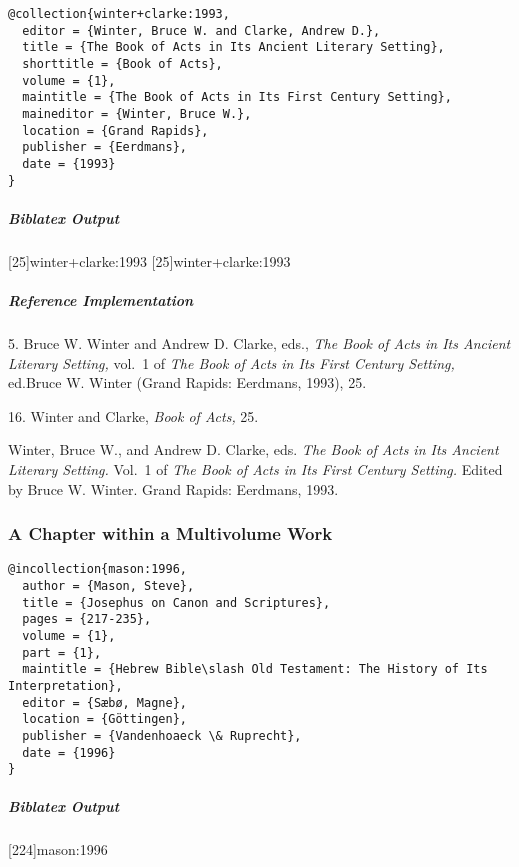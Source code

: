 \documentclass[a4paper]{article}
\newenvironment{biboutput}{%
  \subparagraph{Biblatex Output}
}{\color{black}}
\newenvironment{refimp}{%
  \subparagraph{Reference Implementation}
  \color{reference-colour}
  \rm
}{\par\color{black}}
\begin{document}
\begin{lstlisting}
@collection{winter+clarke:1993,
  editor = {Winter, Bruce W. and Clarke, Andrew D.},
  title = {The Book of Acts in Its Ancient Literary Setting},
  shorttitle = {Book of Acts},
  volume = {1},
  maintitle = {The Book of Acts in Its First Century Setting},
  maineditor = {Winter, Bruce W.},
  location = {Grand Rapids},
  publisher = {Eerdmans},
  date = {1993}
}
\end{lstlisting}  

\begin{biboutput}
  [25]{winter+clarke:1993}
  [25]{winter+clarke:1993}
\end{biboutput}

\begin{refimp}
  \hspace*{\bibindent}5. Bruce W. Winter and Andrew D. Clarke, eds., \emph{The
  Book of Acts in Its Ancient Literary Setting,} vol.~1 of \emph{The Book of
  Acts in Its First Century Setting,} ed.\@ Bruce W. Winter (Grand Rapids:
  Eerdmans, 1993), 25.

  \hspace*{\bibindent}16. Winter and Clarke, \emph{Book of Acts,} 25.

  \hangindent\bibindent Winter, Bruce W., and Andrew D. Clarke, eds. \emph{The
  Book of Acts in Its Ancient Literary Setting.} Vol.~1 of \emph{The Book of
  Acts in Its First Century Setting.} Edited by Bruce W. Winter. Grand Rapids:
  Eerdmans, 1993.
\end{refimp}

\subsubsection{A Chapter within a Multivolume Work}

\begin{lstlisting}
@incollection{mason:1996,
  author = {Mason, Steve},
  title = {Josephus on Canon and Scriptures},
  pages = {217-235},
  volume = {1},
  part = {1},
  maintitle = {Hebrew Bible\slash Old Testament: The History of Its Interpretation},
  editor = {Sæbø, Magne},
  location = {Göttingen},
  publisher = {Vandenhoaeck \& Ruprecht},
  date = {1996}
}
\end{lstlisting}

\begin{biboutput}
  [224]{mason:1996}
\end{biboutput}
\end{document}
